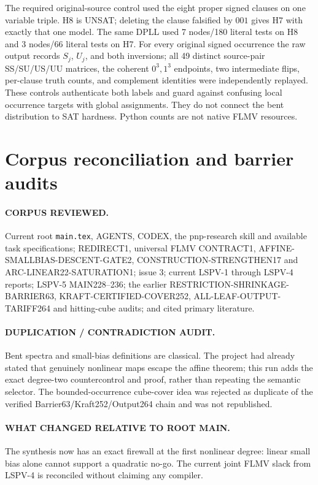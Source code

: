 \documentclass[11pt]{article}
\begin{document}
The required original-source control used the eight proper signed clauses on
one variable triple.  H8 is UNSAT; deleting the clause falsified by $001$ gives
H7 with exactly that one model.  The same DPLL used 7 nodes/180 literal tests on
H8 and 3 nodes/66 literal tests on H7.  For every original signed occurrence the
raw output records $S_j$, $U_j$, and both inversions; all 49 distinct source-pair
SS/SU/US/UU matrices, the coherent $0^3,1^3$ endpoints, two intermediate flips,
per-clause truth counts, and complement identities were independently replayed.
These controls authenticate both labels and guard against confusing local
occurrence targets with global assignments.  They do not connect the bent
distribution to SAT hardness.  Python counts are not native FLMV resources.

\section{Corpus reconciliation and barrier audits}
\paragraph{CORPUS REVIEWED.}
Current root \texttt{main.tex}, AGENTS, CODEX, the pnp-research skill and
available task specifications; REDIRECT1, universal FLMV CONTRACT1,
AFFINE-SMALLBIAS-DESCENT-GATE2, CONSTRUCTION-STRENGTHEN17 and
ARC-LINEAR22-SATURATION1; issue 3; current LSPV-1 through LSPV-4 reports;
LSPV-5 MAIN228--236; the earlier RESTRICTION-SHRINKAGE-BARRIER63,
KRAFT-CERTIFIED-COVER252, ALL-LEAF-OUTPUT-TARIFF264 and hitting-cube audits;
and cited primary literature.

\paragraph{DUPLICATION / CONTRADICTION AUDIT.}
Bent spectra and small-bias definitions are classical.  The project had already
stated that genuinely nonlinear maps escape the affine theorem; this run adds
the exact degree-two countercontrol and proof, rather than repeating the semantic
selector.  The bounded-occurrence cube-cover idea was rejected as duplicate of
the verified Barrier63/Kraft252/Output264 chain and was not republished.

\paragraph{WHAT CHANGED RELATIVE TO ROOT MAIN.}
The synthesis now has an exact firewall at the first nonlinear degree: linear
small bias alone cannot support a quadratic no-go.  The current joint FLMV slack
from LSPV-4 is reconciled without claiming any compiler.
\end{document}
